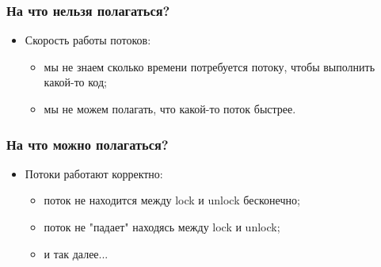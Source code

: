 \begin{frame}
\frametitle{На что нельзя полагаться?}
\begin{itemize}
    \item<1->Скорость работы потоков:
    \begin{itemize}
        \item<2->мы не знаем сколько времени потребуется потоку, чтобы
             выполнить какой-то код;
        \item<3->мы не можем полагать, что какой-то поток быстрее.
    \end{itemize}
\end{itemize}
\end{frame}

\begin{frame}
\frametitle{На что можно полагаться?}
\begin{itemize}
    \item<1->Потоки работают корректно:
    \begin{itemize}
        \item<2->поток не находится между lock и unlock бесконечно;
        \item<3->поток не "падает" находясь между lock и unlock;
        \item<4->и так далее...
    \end{itemize}
\end{itemize}
\end{frame}
